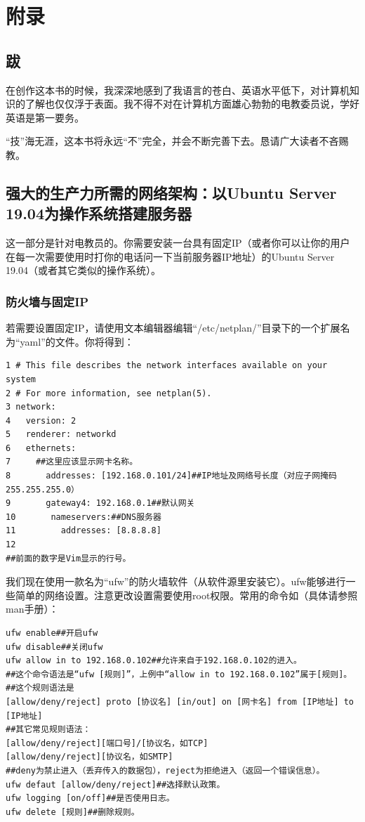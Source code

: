 \chapter{附录}
\section{跋}
在创作这本书的时候，我深深地感到了我语言的苍白、英语水平低下，对计算机知识的了解也仅仅浮于表面。我不得不对在计算机方面雄心勃勃的电教委员说，学好英语是第一要务。\par
“技”海无涯，这本书将永远“不”完全，并会不断完善下去。恳请广大读者不吝赐教。
\section{强大的生产力所需的网络架构：以Ubuntu Server 19.04为操作系统搭建服务器}
这一部分是针对电教员的。你需要安装一台具有固定IP（或者你可以让你的用户在每一次需要使用时打你的电话问一下当前服务器IP地址）的Ubuntu Server 19.04（或者其它类似的操作系统）。
\subsection{防火墙与固定IP}
若需要设置固定IP，请使用文本编辑器编辑“/etc/netplan/”目录下的一个扩展名为“yaml”的文件。你将得到：
\begin{verbatim}
1 # This file describes the network interfaces available on your system
2 # For more information, see netplan(5).
3 network:
4   version: 2
5   renderer: networkd
6   ethernets:
7     ##这里应该显示网卡名称。
8       addresses: [192.168.0.101/24]##IP地址及网络号长度（对应子网掩码255.255.255.0）
9       gateway4: 192.168.0.1##默认网关
10       nameservers:##DNS服务器
11         addresses: [8.8.8.8]
12
##前面的数字是Vim显示的行号。
\end{verbatim}\par
我们现在使用一款名为“ufw”的防火墙软件（从软件源里安装它）。ufw能够进行一些简单的网络设置。注意更改设置需要使用root权限。常用的命令如（具体请参照man手册）：
\begin{verbatim}
ufw enable##开启ufw
ufw disable##关闭ufw
ufw allow in to 192.168.0.102##允许来自于192.168.0.102的进入。
##这个命令语法是“ufw [规则]”，上例中“allow in to 192.168.0.102”属于[规则]。
##这个规则语法是
[allow/deny/reject] proto [协议名] [in/out] on [网卡名] from [IP地址] to [IP地址]
##其它常见规则语法：
[allow/deny/reject][端口号]/[协议名，如TCP]
[allow/deny/reject][协议名，如SMTP]
##deny为禁止进入（丢弃传入的数据包），reject为拒绝进入（返回一个错误信息）。
ufw defaut [allow/deny/reject]##选择默认政策。
ufw logging [on/off]##是否使用日志。
ufw delete [规则]##删除规则。
\end{verbatim}
